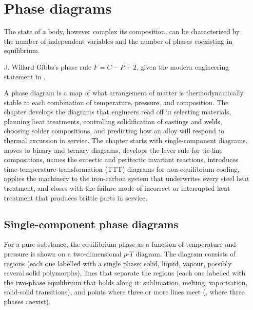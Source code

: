 \chapter{Phase diagrams}
\label{vol05:ch04}

\epigraph{The state of a body, however complex its composition, can be
characterized by the number of independent variables and the number of
phases coexisting in equilibrium.}{J. Willard Gibbs's phase rule
$F = C - P + 2$, given the modern engineering statement in
\textcite[ch.~9]{text:porter-easterling-phase}.}


\noindent
A phase diagram is a map of what arrangement of matter is
thermodynamically stable at each combination of temperature, pressure,
and composition. The chapter develops the diagrams that engineers
read off in selecting materials, planning heat treatments, controlling
solidification of castings and welds, choosing solder compositions,
and predicting how an alloy will respond to thermal excursion in
service. The chapter starts with single-component diagrams, moves to
binary and ternary diagrams, develops the lever rule for tie-line
compositions, names the eutectic and peritectic invariant reactions,
introduces time-temperature-transformation (TTT) diagrams for
non-equilibrium cooling, applies the machinery to the iron-carbon
system that underwrites every steel heat treatment, and closes with
the failure mode of incorrect or interrupted heat treatment that
produces brittle parts in service.

\section{Single-component phase diagrams}

For a pure substance, the equilibrium phase as a function of temperature
and pressure is shown on a two-dimensional $p$-$T$ diagram. The diagram
consists of regions (each one labelled with a single phase: solid,
liquid, vapour, possibly several solid polymorphs), lines that separate
the regions (each one labelled with the two-phase equilibrium that
holds along it: sublimation, melting, vaporisation, solid-solid
transitions), and points where three or more lines meet
(, where three phases coexist).

